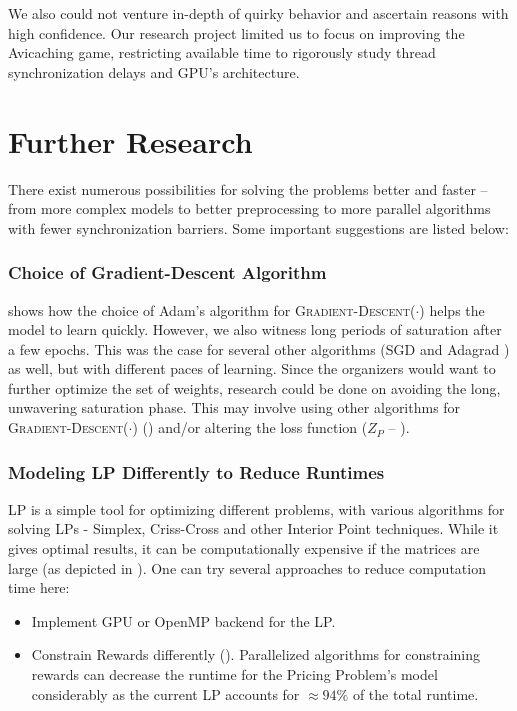 We also could not venture in-depth of quirky behavior and ascertain reasons with high confidence. Our research project limited us to focus on improving the Avicaching game, restricting available time to rigorously study thread synchronization delays and GPU's architecture.

\section{Further Research}
There exist numerous possibilities for solving the problems better and faster -- from more complex models to better preprocessing to more parallel algorithms with fewer synchronization barriers. Some important suggestions are listed below:

\subsubsection{Choice of Gradient-Descent Algorithm}
 shows how the choice of Adam's algorithm \cite{Adam} for \textsc{Gradient-Descent}($\cdot$) helps the model to learn quickly. However, we also witness long periods of saturation after a few epochs. This was the case for several other algorithms (SGD \cite{SGD} and Adagrad \cite{Adagrad}) as well, but with different paces of learning. Since the organizers would want to further optimize the set of weights, research could be done on avoiding the long, unwavering saturation phase. This may involve using other algorithms for \textsc{Gradient-Descent}($\cdot$) () and/or altering the loss function ($Z_P$ -- ).

\subsubsection{Modeling LP Differently to Reduce Runtimes}
LP is a simple tool for optimizing different problems, with various algorithms for solving LPs - Simplex, Criss-Cross and other Interior Point techniques. While it gives optimal results, it can be computationally expensive if the matrices are large (as depicted in ). One can try several approaches to reduce computation time here:
\begin{itemize}
    \item Implement GPU or OpenMP backend for the LP.
    \item Constrain Rewards differently (). Parallelized algorithms for constraining rewards can decrease the runtime for the Pricing Problem's model considerably as the current LP accounts for $\approx 94\%$ of the total runtime.
\end{itemize}
